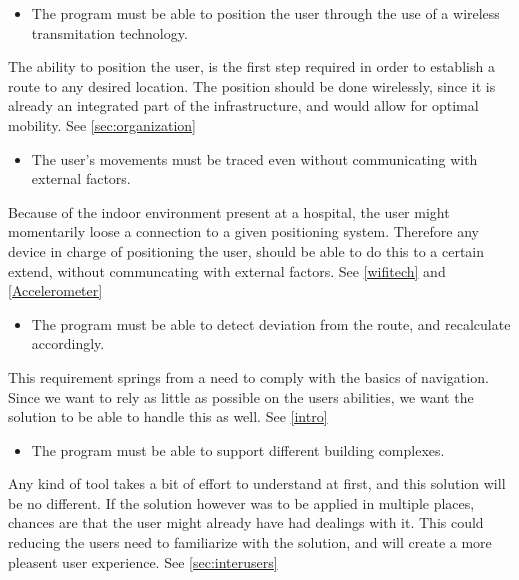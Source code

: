 \begin{itemize}
	\item The program must be able to position the user through the use of a wireless transmitation technology.
\end{itemize}
The ability to position the user, is the first step required in order to establish a route to any desired location. The position should be done wirelessly, since it is already an integrated part of the infrastructure, and would allow for optimal mobility. See \cref{sec:organization}

\begin{itemize}
	\item The user's movements must be traced even without communicating with external factors.
\end{itemize}
Because of the indoor environment present at a hospital, the user might momentarily loose a connection to a given positioning system. Therefore any device in charge of positioning the user, should be able to do this to a certain extend, without communcating with external factors. See \cref{wifitech} and \cref{Accelerometer}

\begin{itemize}
	\item The program must be able to detect deviation from the route, and recalculate accordingly.
\end{itemize}
This requirement springs from a need to comply with the basics of navigation. Since we want to rely as little as possible on the users abilities, we want the solution to be able to handle this as well. See \cref{intro}

\begin{itemize}
	\item The program must be able to support different building complexes.
\end{itemize}
Any kind of tool takes a bit of effort to understand at first, and this solution will be no different. If the solution however was to be applied in multiple places, chances are that the user might already have had dealings with it. This could reducing the users need to familiarize with the solution, and will create a more pleasent user experience. See \cref{sec:interusers}

